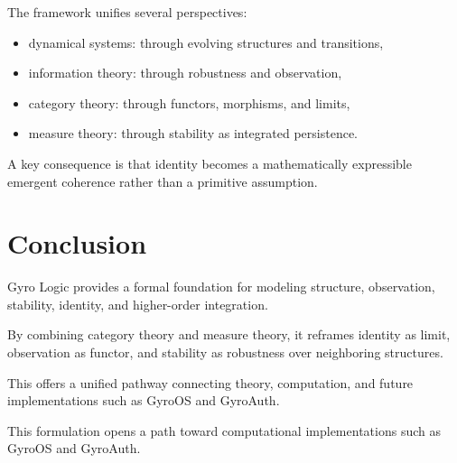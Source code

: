 \documentclass[11pt,a4paper]{article}
\begin{document}
The framework unifies several perspectives:

\begin{itemize}
  \item dynamical systems: through evolving structures and transitions,
  \item information theory: through robustness and observation,
  \item category theory: through functors, morphisms, and limits,
  \item measure theory: through stability as integrated persistence.
\end{itemize}

A key consequence is that identity becomes a mathematically expressible emergent coherence rather than a primitive assumption.

\section{Conclusion}

Gyro Logic provides a formal foundation for modeling structure, observation, stability, identity, and higher-order integration.

By combining category theory and measure theory, it reframes identity as limit, observation as functor, and stability as robustness over neighboring structures.

This offers a unified pathway connecting theory, computation, and future implementations such as GyroOS and GyroAuth.

This formulation opens a path toward computational implementations such as GyroOS and GyroAuth.
\end{document}
